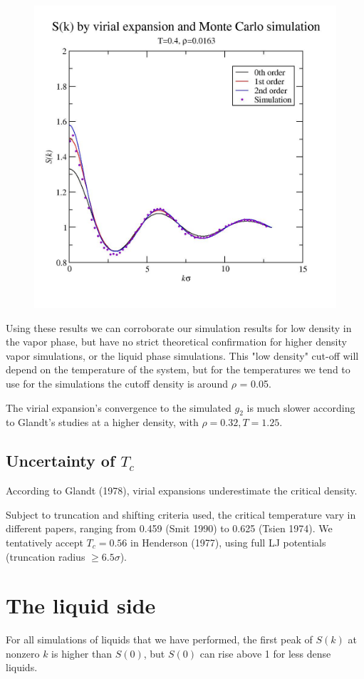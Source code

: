 \documentclass[12pt]{article}
\begin{document}
\begin{figure}[H]
		\centering
		\includegraphics[width=0.7\linewidth]{Skrho0x0163t0x40}
		\label{fig:Skrho0x0163t0x40}
\end{figure}
\noindent
Using these results we can corroborate our simulation results for low density in the vapor phase, but have no strict theoretical confirmation for higher density vapor simulations, or the liquid phase simulations. This "low density" cut-off will depend on the temperature of the system, but for the temperatures we tend to use for the simulations the cutoff density is around $\rho$ = 0.05.

The virial expansion's convergence to the simulated $g_2$ is much slower according to Glandt's studies at a higher density, with $\rho=0.32, T=1.25$.

\subsection{Uncertainty of $T_c$}
According to Glandt (1978), virial expansions underestimate the critical density. 

Subject to truncation and shifting criteria used, the critical temperature vary in different papers, ranging from 0.459 (Smit 1990) to 0.625 (Tsien 1974). We tentatively accept $T_c=0.56$ in Henderson (1977), using full LJ potentials (truncation radius $\geq6.5\sigma$). 

\section{The liquid side}
For all simulations of liquids that we have performed, the first peak of $S(k)$ at nonzero $k$ is higher than $S(0)$, but $S(0)$ can rise above 1 for less dense liquids. 
\end{document}
